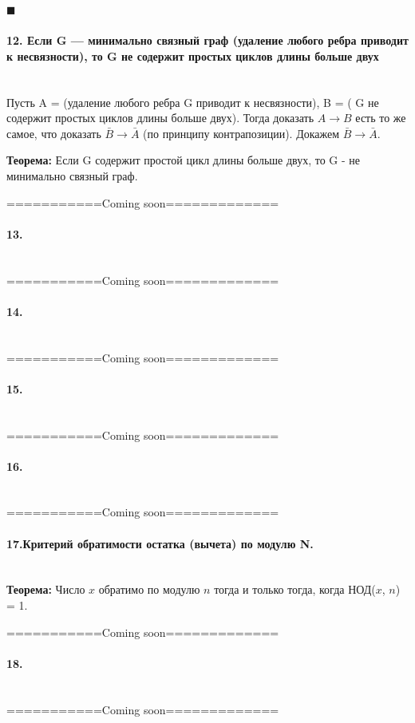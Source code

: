 \documentclass[a4paper, 12pt]{article}
\newcommand{\parag}[1]{\paragraph{#1}\mbox{}\\}
\begin{document}
\noindent
$\blacksquare$

\parag{12. Если G — минимально связный граф (удаление любого ребра приводит к несвязности), то G не содержит простых циклов длины больше двух}
Пусть A = (удаление любого ребра G приводит к несвязности), B = ( G не содержит простых циклов длины больше двух). Тогда доказать $A \rightarrow B$ есть то же самое, что доказать $\bar B \rightarrow \bar A$ (по принципу контрапозиции). Докажем $\bar B \rightarrow \bar A$.

\noindent
\textbf{Теорема:} Если G содержит простой цикл длины больше двух, то G - не минимально связный граф.

\noindent
===========Coming soon=============

\parag{13.}
===========Coming soon=============

\parag{14.}
===========Coming soon=============

\parag{15.}
===========Coming soon=============

\parag{16.}
===========Coming soon=============

\parag{17.Критерий обратимости остатка (вычета) по модулю N.}
\textbf{Теорема:} Число $x$ обратимо по модулю $n$ тогда и только тогда, когда НОД($x$, $n$) = 1.

\noindent
===========Coming soon=============

\parag{18.}
===========Coming soon=============
\end{document}
